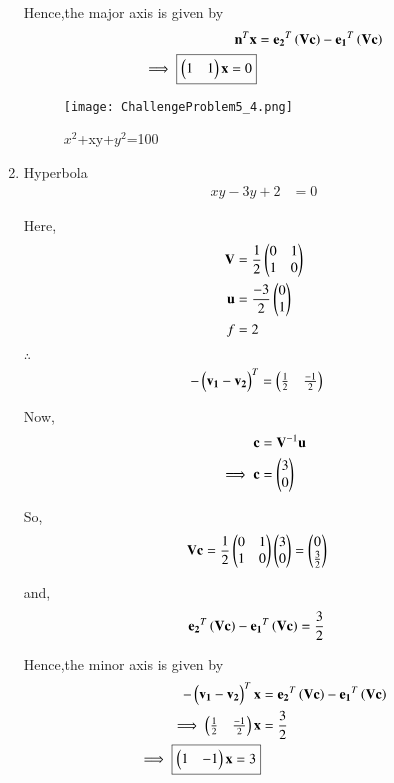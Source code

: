 \documentclass[journal,12pt,twocolumn]{IEEEtran}
\begin{document}
\begin{enumerate}
    Hence,the major axis is given by
    \begin{align}
        \mathbf{n}^T\mathbf{x} &= \mathbf{e_2}^T\left(\mathbf{V}\mathbf{c}\right) - \mathbf{e_1}^T\left(\mathbf{V}\mathbf{c}\right)
        \\
        \implies \boxed{\begin{pmatrix}1 & 1\end{pmatrix}\mathbf{x} = 0}
    \end{align}
    
    \begin{figure}[!ht]
    \centering
    \texttt{[image: ChallengeProblem5\_4.png]}
    \caption{$x^2$+xy+$y^2$=100}
    \label{ex4}	
    \end{figure}
    
    \item Hyperbola
    \begin{align}
        xy-3y+2 &= 0
    \end{align}
    
    Here,
    \begin{align}
    \mathbf{V} &= \frac{1}{2}\begin{pmatrix}0 & 1 \\ 1 & 0\end{pmatrix} \\
    \mathbf{u} &= \frac{-3}{2}\begin{pmatrix}0 \\ 1\end{pmatrix} \\
    f &= 2
    \end{align}

    $\therefore$
    \begin{align}
    -\begin{pmatrix}\mathbf{v_1}-\mathbf{v_2}\end{pmatrix}^T &= \begin{pmatrix}\frac{1}{2} & \frac{-1}{2}\end{pmatrix}
    \end{align}

    Now,
    \begin{align}
    \mathbf{c} &= \mathbf{V}^{-1}\mathbf{u}\\
    \implies \mathbf{c} &= \begin{pmatrix}3 \\ 0\end{pmatrix}
    \end{align}

    So,
    \begin{align}
    \mathbf{V}\mathbf{c} &= \frac{1}{2}\begin{pmatrix}0 & 1 \\ 1 & 0\end{pmatrix}\begin{pmatrix}3 \\ 0\end{pmatrix}=\begin{pmatrix}0 \\ \frac{3}{2}\end{pmatrix}
    \end{align}

    and,
    \begin{align}
    \mathbf{e_2}^T\left(\mathbf{V}\mathbf{c}\right) - \mathbf{e_1}^T\left(\mathbf{V}\mathbf{c}\right) &= \frac{3}{2}
    \end{align}

    Hence,the minor axis is given by
    \begin{align}
    -\begin{pmatrix}\mathbf{v_1}-\mathbf{v_2}\end{pmatrix}^T\mathbf{x} &=\mathbf{e_2}^T\left(\mathbf{V}\mathbf{c}\right) - \mathbf{e_1}^T\left(\mathbf{V}\mathbf{c}\right) \\
    \implies \begin{pmatrix}\frac{1}{2} & \frac{-1}{2}\end{pmatrix}\mathbf{x} &= \frac{3}{2} \\
    \implies \boxed{\begin{pmatrix}1 & -1\end{pmatrix}\mathbf{x} = 3}
    \end{align}
    

\end{enumerate}
\end{document}
